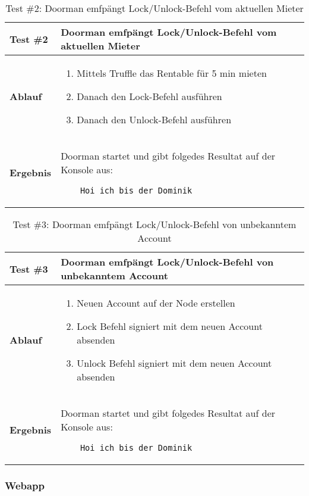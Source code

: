 \begin{table}[H]
\centering
\caption{Test \#2: Doorman emfpängt Lock/Unlock-Befehl vom aktuellen Mieter}
\label{my-label}
\begin{tabular}{@{}L{1.6cm}L{11cm}@{}}
\toprule
\textbf{Test \#2}
& Doorman emfpängt Lock/Unlock-Befehl vom aktuellen Mieter
\\ \midrule
\textbf{Ablauf}
& 
\begin{enumerate}
    \item Mittels Truffle das Rentable für 5 min mieten
    \item Danach den Lock-Befehl ausführen
    \item Danach den Unlock-Befehl ausführen
\end{enumerate}
\\ \midrule
\textbf{Ergebnis}
& Doorman startet und gibt folgedes Resultat auf der Konsole aus:
\begin{verbatim}
    Hoi ich bis der Dominik
\end{verbatim}
\\ \bottomrule
\end{tabular}
\end{table}

\begin{table}[H]
\centering
\caption{Test \#3: Doorman emfpängt Lock/Unlock-Befehl von unbekanntem Account}
\label{my-label}
\begin{tabular}{@{}L{1.6cm}L{11cm}@{}}
\toprule
\textbf{Test \#3}
& Doorman emfpängt Lock/Unlock-Befehl von unbekanntem Account
\\ \midrule
\textbf{Ablauf}
& 
\begin{enumerate}
    \item Neuen Account auf der Node erstellen
    \item Lock Befehl signiert mit dem neuen Account absenden
    \item Unlock Befehl signiert mit dem neuen Account absenden
\end{enumerate}
\\ \midrule
\textbf{Ergebnis}
& Doorman startet und gibt folgedes Resultat auf der Konsole aus:
\begin{verbatim}
    Hoi ich bis der Dominik
\end{verbatim}
\\ \bottomrule
\end{tabular}
\end{table}

\subsubsection{Webapp}

